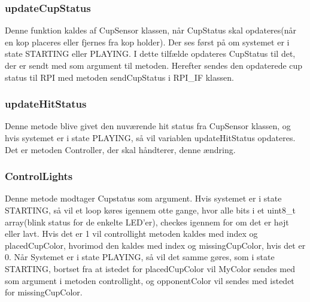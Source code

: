 \documentclass[Softwaredesign/Softwaredesign_main.tex]{subfiles}
\begin{document}
\subsubsection{updateCupStatus}
Denne funktion kaldes af CupSensor klassen, når CupStatus skal opdateres(når en kop placeres eller fjernes fra kop holder). Der ses først på om systemet er i state STARTING eller PLAYING. I dette tilfælde opdateres CupStatus til det, der er sendt med som argument til metoden. Herefter sendes den opdaterede cup 
status til RPI med metoden sendCupStatus i RPI\_IF klassen. 
\subsubsection{updateHitStatus}
Denne metode blive givet den nuværende hit status fra CupSensor klassen, og hvis systemet er i state PLAYING, så vil variablen updateHitStatus opdateres. Det er metoden Controller, der skal håndterer, denne ændring.
\subsubsection{ControlLights}
Denne metode modtager Cupstatus som argument. Hvis systemet er i state STARTING, så vil et loop køres igennem otte gange, hvor alle bits i et uint8\_t array(blink status for de enkelte LED'er), checkes igennem for om det er højt eller lavt. Hvis det er 1 vil controllight metoden kaldes med index og placedCupColor, hvorimod den kaldes med index og missingCupColor, hvis det er 0. Når Systemet er i state PLAYING, så vil det samme gøres, som i state STARTING, bortset fra at istedet for placedCupColor vil MyColor sendes med som argument i metoden controllight, og opponentColor vil sendes med istedet for missingCupColor.
\end{document}
